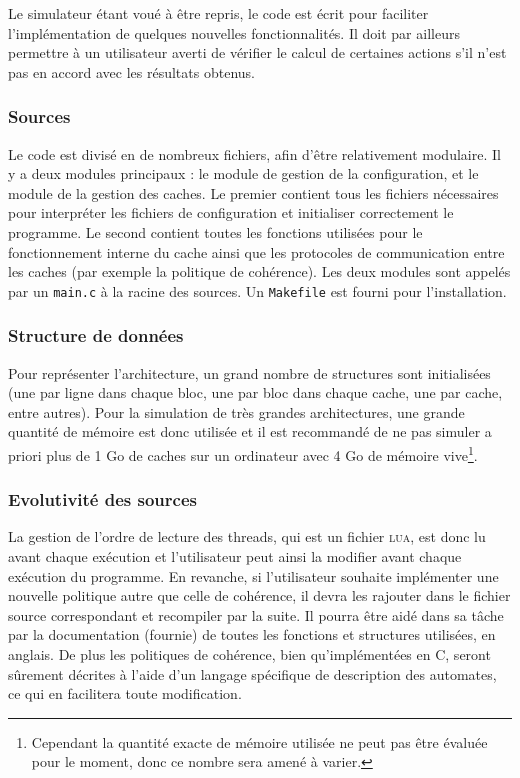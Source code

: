 Le simulateur étant voué à être repris, le code est écrit pour faciliter l'implémentation de quelques nouvelles fonctionnalités. Il doit par ailleurs permettre à un utilisateur averti de vérifier le calcul de certaines actions s'il n'est pas en accord avec les résultats obtenus.

\subsubsection{Sources}

Le code est divisé en de nombreux fichiers, afin d'être relativement modulaire. Il y a deux modules principaux : le module de gestion de la configuration, et le module de la gestion des caches. Le premier contient tous les fichiers nécessaires pour interpréter les fichiers de configuration et initialiser correctement le programme. Le second contient toutes les fonctions utilisées pour le fonctionnement interne du cache ainsi que les protocoles de communication entre les caches (par exemple la politique de cohérence). Les deux modules sont appelés par un \verb!main.c! à la racine des sources. Un \verb!Makefile! est fourni pour l'installation.

\subsubsection{Structure de données}

Pour représenter l'architecture, un grand nombre de structures sont initialisées (une par ligne dans chaque bloc, une par bloc dans chaque cache, une par cache, entre autres). Pour la simulation de très grandes architectures, une grande quantité de mémoire est donc utilisée et il est recommandé de ne pas simuler a priori plus de 1 Go de caches sur un ordinateur avec 4 Go de mémoire vive\footnote{Cependant la quantité exacte de mémoire utilisée ne peut pas être évaluée pour le moment, donc ce nombre sera amené à varier.}.

\subsubsection{Evolutivité des sources}

La gestion de l'ordre de lecture des threads, qui est un fichier \textsc{lua}, est donc lu avant chaque exécution et l'utilisateur peut ainsi la modifier avant chaque exécution du programme. En revanche, si l'utilisateur souhaite implémenter une nouvelle politique autre que celle de cohérence, il devra les rajouter dans le fichier source correspondant et recompiler par la suite. Il pourra être aidé dans sa tâche par la documentation (fournie) de toutes les fonctions et structures utilisées, en anglais. De plus les politiques de cohérence, bien qu'implémentées en \textsc{C}, seront sûrement décrites à l'aide d'un langage spécifique de description des automates, ce qui en facilitera toute modification.
